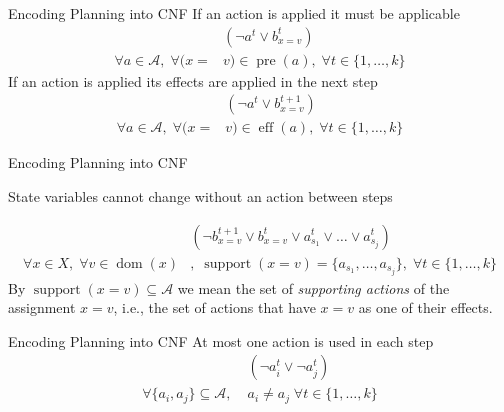 \documentclass[t]{sdqbeamer}
\begin{document}
\begin{frame}{Encoding Planning into CNF}
If an action is applied it must be applicable
\begin{equation}
\label{eq2-3}
\begin{split}
&(\neg a^t \vee b_{x=v}^t)\\
\forall a \in \mathcal{A},\; \forall (x=&v)\in \operatorname{pre}(a),\; \forall t \in \{1,\dots,k\}
\end{split}
\end{equation}
If an action is applied its effects are applied in the next step
\begin{equation}
\label{eq2-4}
\begin{split}
&(\neg a^t \vee b_{x=v}^{t+1})\\
\forall a \in \mathcal{A},\; \forall (x=&v)\in \operatorname{eff}(a),\; \forall t \in \{1,\dots,k\}
\end{split}
\end{equation}
\end{frame}

\begin{frame}{Encoding Planning into CNF}

State variables cannot change without an action between steps

\begin{equation}
\label{eq2-5}
\begin{split}
&(\neg b_{x=v}^{t+1} \vee b_{x=v}^{t} \vee a_{s_1}^t \vee \dots \vee a_{s_j}^t)\\
\forall x \in X,\; \forall v \in \operatorname{dom}(x)&, \; 
\operatorname{support}(x=v)=\{a_{s_1},\dots,a_{s_j}\},\; \forall t \in \{1,\dots,k\}
\end{split}
\end{equation}
By $\operatorname{support}(x=v) \subseteq \mathcal{A}$ we mean the set of \emph{supporting actions}
of the assignment $x=v$, i.e., the set of actions that have $x=v$ as one of their effects.
\end{frame}


\begin{frame}{Encoding Planning into CNF}
At most one action is used in each step
\begin{equation}
\label{eq2-6}
\begin{split}
&(\neg a_{i}^t \vee \neg a_{j}^t)\\
\forall \{a_i,a_j\} \subseteq  \mathcal{A},\; &a_i \neq a_j \; \forall t \in \{1,\dots,k\}
\end{split}
\end{equation}
\end{frame}
\end{document}
